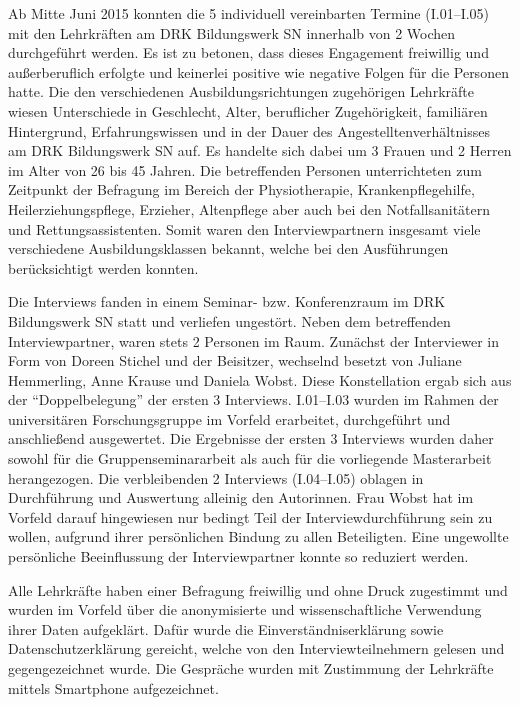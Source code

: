 Ab Mitte Juni 2015 konnten die 5 individuell vereinbarten Termine (I.01--I.05) mit den Lehrkräften am DRK Bildungswerk SN innerhalb von 2 Wochen durchgeführt werden. Es ist zu betonen, dass dieses Engagement freiwillig und außerberuflich erfolgte und keinerlei positive wie negative Folgen für die Personen hatte. Die den verschiedenen Ausbildungsrichtungen zugehörigen Lehrkräfte wiesen Unterschiede in Geschlecht, Alter, beruflicher Zugehörigkeit, familiären Hintergrund, Erfahrungswissen und in der Dauer des Angestelltenverhältnisses am DRK Bildungswerk SN auf. Es handelte sich dabei um 3 Frauen und 2 Herren im Alter von 26 bis 45 Jahren. Die betreffenden Personen unterrichteten zum Zeitpunkt der Befragung im Bereich der Physiotherapie, Krankenpflegehilfe, Heilerziehungspflege, Erzieher, Altenpflege aber auch bei den Notfallsanitätern und Rettungsassistenten. Somit waren den Interviewpartnern insgesamt viele verschiedene Ausbildungsklassen bekannt, welche bei den Ausführungen berücksichtigt werden konnten.

Die Interviews fanden in einem Seminar- bzw. Konferenzraum im DRK Bildungswerk SN statt und verliefen ungestört.
Neben dem betreffenden Interviewpartner, waren stets 2 Personen im Raum. Zunächst der Interviewer in Form von Doreen Stichel und der Beisitzer, wechselnd besetzt von Juliane Hemmerling, Anne Krause und Daniela Wobst. Diese Konstellation ergab sich aus der "`Doppelbelegung"' der ersten 3 Interviews. I.01--I.03 wurden im Rahmen der universitären Forschungsgruppe im Vorfeld erarbeitet, durchgeführt und anschließend ausgewertet. Die Ergebnisse der ersten 3 Interviews wurden daher sowohl für die Gruppenseminararbeit als auch für die vorliegende Masterarbeit herangezogen. Die verbleibenden 2 Interviews (I.04--I.05) oblagen in Durchführung und Auswertung alleinig den Autorinnen. Frau Wobst hat im Vorfeld darauf hingewiesen nur bedingt Teil der Interviewdurchführung sein zu wollen, aufgrund ihrer persönlichen Bindung zu allen Beteiligten. Eine ungewollte persönliche Beeinflussung der Interviewpartner konnte so reduziert werden.

Alle Lehrkräfte haben einer Befragung freiwillig und ohne Druck zugestimmt und wurden im Vorfeld über die anonymisierte und wissenschaftliche Verwendung ihrer Daten aufgeklärt. Dafür wurde die Einverständniserklärung sowie Datenschutzerklärung gereicht, welche von den Interviewteilnehmern gelesen und gegengezeichnet wurde. Die Gespräche wurden mit Zustimmung der Lehrkräfte mittels Smartphone aufgezeichnet.  

